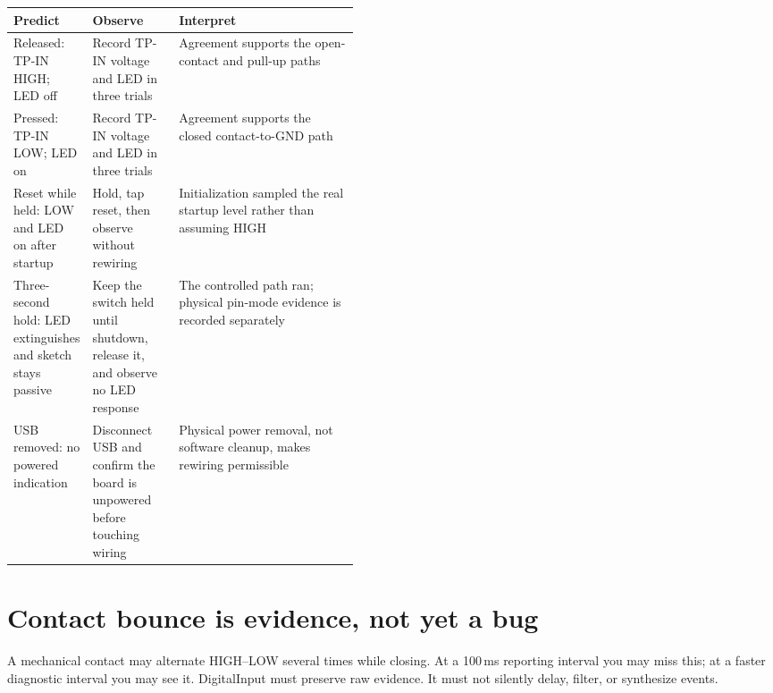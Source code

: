 \documentclass[11pt]{article}
\begin{document}
\begin{center}
\begin{tabularx}{\linewidth}{@{}p{0.20\linewidth}p{0.25\linewidth}X@{}}
\toprule
Predict & Observe & Interpret\\
\midrule
Released: TP-IN HIGH; LED off
& Record TP-IN voltage and LED in three trials
& Agreement supports the open-contact and pull-up paths\\
Pressed: TP-IN LOW; LED on
& Record TP-IN voltage and LED in three trials
& Agreement supports the closed contact-to-GND path\\
Reset while held: LOW and LED on after startup
& Hold, tap reset, then observe without rewiring
& Initialization sampled the real startup level rather than assuming HIGH\\
Three-second hold: LED extinguishes and sketch stays passive
& Keep the switch held until shutdown, release it, and observe no LED response
& The controlled path ran; physical pin-mode evidence is recorded separately\\
USB removed: no powered indication
& Disconnect USB and confirm the board is unpowered before touching wiring
& Physical power removal, not software cleanup, makes rewiring permissible\\
\bottomrule
\end{tabularx}
\end{center}

\section{Contact bounce is evidence, not yet a bug}

A mechanical contact may alternate HIGH--LOW several times while closing. At a
100\,ms reporting interval you may miss this; at a faster diagnostic interval you
may see it. DigitalInput must preserve raw evidence. It must not silently delay,
filter, or synthesize events.

\begin{center}
\end{center}
\end{document}
